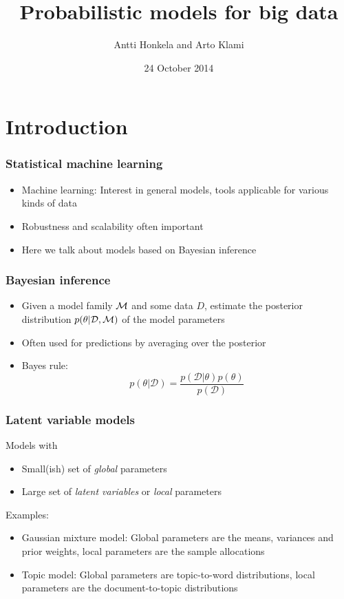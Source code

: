 \documentclass{beamer}
\title{Probabilistic models for big data}
\author{Antti Honkela and Arto Klami}
\date{24 October 2014}
\newcommand{\dataset}{\mathcal{D}}
\newcommand{\parameters}{\theta}
\begin{document}
\frame{\titlepage}


\section{Introduction}

\begin{frame}
  \frametitle{Statistical machine learning}

  \begin{itemize}
  \item Machine learning: Interest in general models, tools applicable
    for various kinds of data
  \item Robustness and scalability often important
  \item Here we talk about models based on Bayesian inference
  \end{itemize}
\end{frame}

\begin{frame}
  \frametitle{Bayesian inference}

  \begin{itemize}
  \item Given a model family ${\cal M}$ and some data $D$, estimate
    the posterior distribution $p(\parameters|\dataset,{\cal M})$ of the model
    parameters
  \item Often used for predictions by averaging over the posterior
  \item Bayes rule:
    \[
    p(\parameters|\dataset) = \frac{p(\dataset|\parameters)p(\parameters)}{p(\dataset)}
    \]
  \end{itemize}
\end{frame}

\begin{frame}
  \frametitle{Latent variable models}

  Models with
  \begin{itemize}
  \item Small(ish) set of \emph{global} parameters
  \item Large set of \emph{latent variables} or \emph{local} parameters
  \end{itemize}

  Examples:
  \begin{itemize}
  \item Gaussian mixture model: Global parameters are the means,
    variances and prior weights, local parameters are the sample
    allocations
  \item Topic model: Global parameters are topic-to-word distributions,
    local parameters are the document-to-topic distributions
  \end{itemize}
\end{frame}
\end{document}
